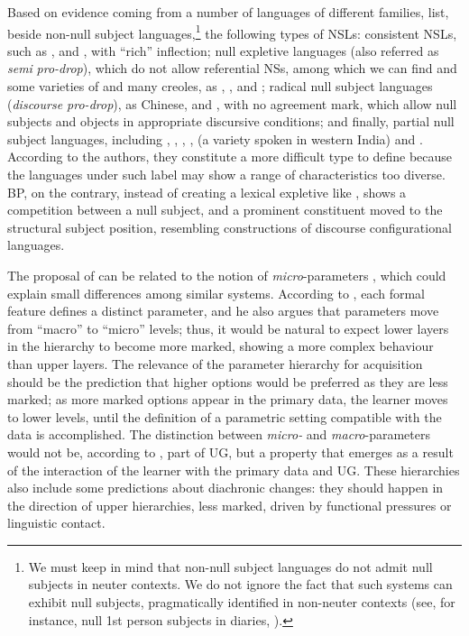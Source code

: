 \documentclass[output=paper]{langsci/langscibook}
\begin{document}
Based on evidence coming from a number of languages of different families,
\citeauthor{RobHol2010} list, beside non-null subject languages,\footnote{We
    must keep in mind that non-null subject languages do not admit null
    subjects in neuter contexts. We do not ignore the fact that such
systems can exhibit null subjects, pragmatically identified in non-neuter
contexts (see, for instance, null 1st person subjects in  diaries,
\citealt{Haegeman1990}).} the following types of \glspl{NSL}: consistent
\glspl{NSL}, such as ,  and , with “rich”
inflection; null expletive languages (also referred as \emph{semi}
\emph{pro-drop}), which do not allow referential NSs, among which we can find
 and some varieties of  and many creoles, as
, , and ; radical null
subject
languages (\emph{discourse pro-drop}), as Chinese,  and
, with no agreement mark, which allow null subjects and objects in
appropriate discursive conditions; and finally, partial null subject languages,
including , , , ,
 (a variety spoken in western India) and .  According to the authors, they constitute a more difficult type
to define because the languages under such label may show a range of
characteristics too diverse. \gls{BP}, on the
contrary, instead of creating a lexical expletive like , shows a
competition between a null subject, and a prominent constituent moved to the
structural subject position, resembling constructions of discourse
configurational languages.

The proposal of  can be related to the notion of
\emph{micro}-parameters \citep{Kayne1996}, which could explain small
differences among similar systems. According to \citet{Roberts2012}, each
formal feature defines a distinct parameter, and he also argues that parameters
move from “macro” to “micro” levels; thus, it would be natural to expect lower
layers in the hierarchy to become more marked, showing a more complex behaviour
than upper layers. The relevance of the parameter hierarchy for acquisition
should be the prediction that higher options would be preferred as they are
less marked; as more marked options appear in the primary data, the learner
moves to lower levels, until the definition of a parametric setting compatible
with the data is accomplished. The distinction between \emph{micro-} and
\emph{macro}-parameters would not be, according to \citet[310]{Roberts2012},
part of \gls{UG}, but a property that emerges as a result of the interaction of the
learner with the primary data and \gls{UG}. These hierarchies also include some
predictions about diachronic changes: they should happen in the direction of
upper hierarchies, less marked, driven by functional pressures or linguistic
contact.
\end{document}

